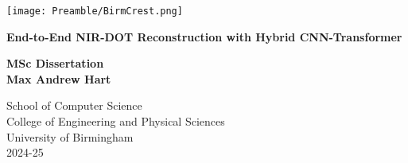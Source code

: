 
\thispagestyle{empty}

\begin{spacing}{2}
	\begin{center}
		\texttt{[image: Preamble/BirmCrest.png]}
	\end{center}
	\vspace{10mm}
	\begin{center}
		\textbf{\Large End-to-End NIR-DOT Reconstruction with Hybrid CNN-Transformer}
		\vspace{10mm}
	\end{center}
	\begin{center}
		\textbf{\large MSc Dissertation}
		\vspace{20mm}
		\\\textbf{\Large Max Andrew Hart}
		\vspace{30mm}
	\end{center}
	\begin{center}
		{\large School of Computer Science}
		\\ {\large College of Engineering and Physical Sciences}
		\\ {\large University of Birmingham}
		\\ {\large 2024-25}
	\end{center}
\end{spacing}


